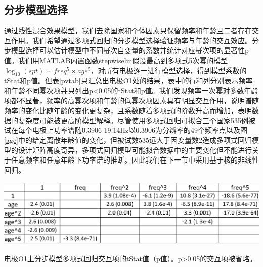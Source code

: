 \subsection{分步模型选择}
通过线性混合效果模型，我们去除国家和个体因素只保留频率和年龄且二者存在交互作用。我们希望通过多项式回归的分步模型选择验证频率与年龄的交互效应。分步模型选择可以估计模型中不同幂次自变量的系数并统计对应幂次项的显著性p值。我们用MATLAB内置函数stepwiselm假设最高到多项式5次幂的模型$\log_{10}(spt)\sim{freq^5\times{age^5}}$，对所有电极逐一进行模型选择，得到模型系数的tStat和p值。但表\ref{pvtab}只汇总出电极O1处的结果，表中的行和列分别表示频率和年龄不同幂次项并只列出p<0.05的tStat和p值。我们发现频率一次幂对多数年龄项都不显著，频率的高幂次项和年龄的低幂次项因素具有明显交互作用，说明谱随频率的变化比随年龄的变化更复杂，且系数随着多项式的阶数升高而增加，表明数据的复杂度可能被更高阶模型解释。尽管使用多项式回归可拟合三个国家535例被试在每个电极上功率谱随0.3906-19.14Hz以0.3906为分辨率的49个频率点以及图\ref{age}中的给定离散年龄值的变化，但被试数535远大于因变量数2造成多项式回归模型的设计矩阵高度奇异，多项式回归模型可能拟合数据中的主要变化但不能进行关于任意频率和任意年龄下功率谱的推断。因此我们在下一节中采用基于核的非线性回归。
\begin{table}[!h]
\includegraphics[width=\linewidth]{pic/Norm/pvtab.png}
\caption{电极O1上分步模型多项式回归交互项的tStat值（p值）。p>0.05的交互项被省略。}
\label{pvtab}
\end{table}

